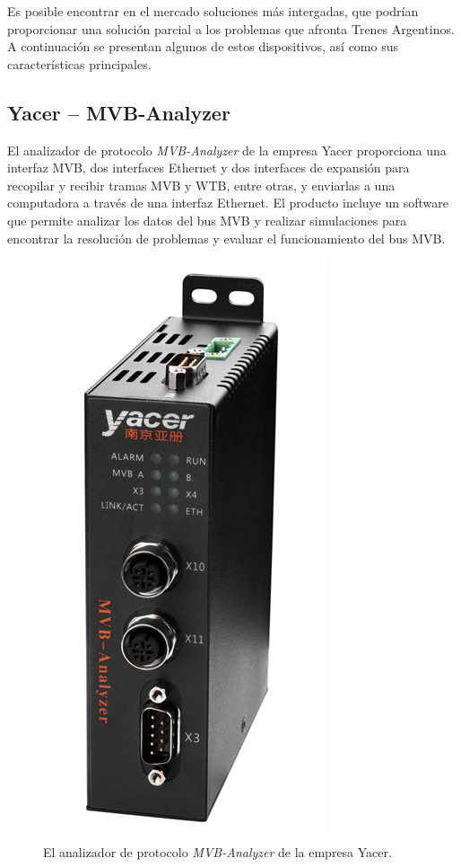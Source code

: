 Es posible encontrar en el mercado soluciones más intergadas, que podrían proporcionar una solución parcial a los problemas que afronta Trenes Argentinos. A continuación se presentan algunos de estos dispositivos, así como sus características principales.

\subsection{Yacer -- MVB-Analyzer}

El analizador de protocolo \textit{MVB-Analyzer} de la empresa Yacer \cite{yacer} proporciona una interfaz MVB, dos interfaces Ethernet y dos interfaces de expansión para recopilar y recibir tramas MVB y WTB, entre otras, y enviarlas a una computadora a través de una interfaz Ethernet. El producto incluye un software que permite analizar los datos del bus MVB y realizar simulaciones para encontrar la resolución de problemas y evaluar el funcionamiento del bus MVB.

\begin{figure}[htbp]
	\centering
	\includegraphics[height=20\baselineskip]{./Figures/yacer.jpg}
	\caption[Yacer -- MVB-Analyzer]{El analizador de protocolo \textit{MVB-Analyzer} de la empresa Yacer.}
\end{figure}


